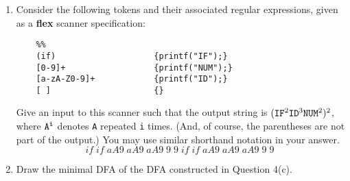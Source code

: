 \documentclass[10pt]{article}
\begin{document}
\begin{enumerate}
\begin{tikzpicture}[shorten >=1pt,node distance=2cm,on grid,auto]
    \end{tikzpicture}

  \newpage
   \item Consider the following tokens and their associated regular expressions, given as a \textbf{flex} scanner specification:

  \begin{lstlisting}
    %%
    (if)                    {printf("IF");}
    [0-9]+                  {printf("NUM");}
    [a-zA-Z0-9]+            {printf("ID");}
    [ ]                     {}
  \end{lstlisting}

  Give an input to this scanner such that the output string is $\tt (IF^{\rm 2} ID^{\rm 3} NUM^{\rm 2})^{\rm 2}$, where $\tt A^i$ denotes {\tt A} repeated {\tt i} times.   (And, of course, the parentheses are not part of the output.)  You may use similar shorthand notation in your answer.
  \[
      if\; if\; aA9\; aA9\; aA9\; 9\; 9\; if\; if\; aA9\; aA9\; aA9\; 9\; 9\;
  \]

  \newpage
  \item Draw the minimal DFA of the DFA constructed in Question 4(c).
   \\
    \\

\end{enumerate}
\end{document}
